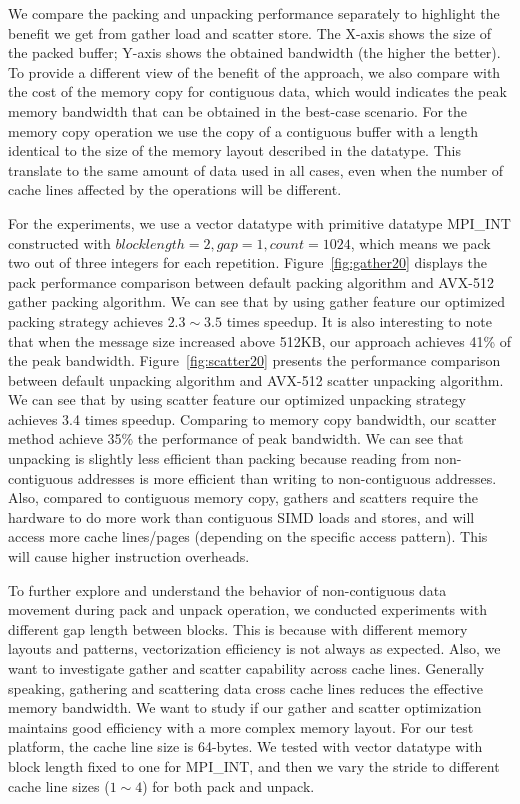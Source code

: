 \documentclass[conference]{IEEEtran}
\begin{document}
We compare the packing and unpacking performance separately to highlight the
benefit we get from gather load and scatter store. The X-axis shows the size of
the packed buffer; Y-axis shows the obtained bandwidth (the higher the better).
%
To provide a different view of the benefit of the approach, we also compare with
the cost of the memory copy for contiguous data, which would indicates the peak
memory bandwidth that can be obtained in the best-case scenario. For the memory
copy operation we use the copy of a contiguous buffer with a length identical to
the size of the memory layout described in the datatype. This translate to the
same amount of data used in all cases, even when the number of cache lines
affected by the operations will be different.

For the experiments, we use a vector datatype with primitive datatype MPI\_INT
constructed with $block length = 2, gap = 1, count = 1024$, which means we pack
two out of three integers for each repetition.
%
Figure~\ref{fig:gather20} displays the pack performance comparison between \ompi
default packing algorithm and AVX-512 gather packing algorithm. We can see that
by using gather feature our optimized packing strategy achieves $2.3 \sim 3.5$
times speedup. It is also interesting to note that  when the message size
increased above 512KB, our approach achieves 41\% of the peak bandwidth.
%
Figure~\ref{fig:scatter20} presents the performance comparison between \ompi
default unpacking algorithm and AVX-512 scatter unpacking algorithm. We can see
that by using scatter feature our optimized unpacking strategy achieves 3.4
times speedup. Comparing to memory copy bandwidth, our scatter method achieve
35\% the performance of peak bandwidth.
%
We can see that unpacking is slightly less efficient than packing because
reading from non-contiguous addresses is more efficient than writing to
non-contiguous addresses. Also, compared to contiguous memory copy, gathers and
scatters require the hardware to do more work than contiguous SIMD loads and
stores, and will access more cache lines/pages (depending on the specific access
pattern). This will cause higher instruction overheads.

To further explore and understand the behavior of non-contiguous data movement during pack and unpack operation,
we conducted experiments with different gap length between blocks. This is because with different memory layouts and patterns, vectorization efficiency is not always as expected. Also, we want to investigate gather and scatter capability across cache lines. Generally speaking, gathering and scattering data cross cache lines reduces the effective memory bandwidth.
We want to study if our gather and scatter optimization maintains good efficiency with a more complex memory layout.
For our test platform, the cache line size is 64-bytes. We tested with vector datatype with block length fixed to one for MPI\_INT, and then we vary the stride to different cache line sizes ($1 \sim 4$) for both pack and unpack.
\end{document}
